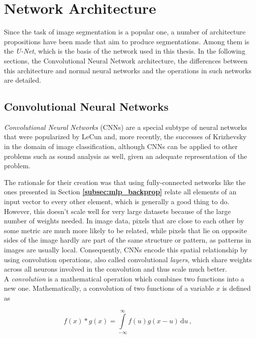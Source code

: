 \chapter {Network Architecture}
\label{chap:network}

Since the task of image segmentation is a popular one, a number of architecture propositions have been made that aim to produce segmentations. Among them is the \textit{U-Net}, which is the basis of the network used in this thesis.  In the following sections, the Convolutional Neural Network architecture, the differences between this architecture and normal neural networks and the operations in such networks are detailed.


	\section{Convolutional Neural Networks}
\label{sec:CNN}
\textit{Convolutional Neural Networks} (CNNs) are a special subtype of neural networks that were popularized by LeCun \cite{lecun98} and, more recently, the successes of Krizhevsky \cite{krizhevsky2012} in the domain of image classification, although CNNs can be applied to other problems such as sound analysis \cite{CNN_sound} as well, given an adequate representation of the problem. 

The rationale for their creation was that using fully-connected networks like the ones presented in Section \textbf{\ref{subsec:mlp_backprop}} relate all elements of an input vector to every other element, which is generally a good thing to do. However, this doesn't scale well for very large datasets because of the large number of weights needed. In image data, pixels that are close to each other by some metric are much more likely to be related, while pixels that lie on opposite sides of the image hardly are part of the same structure or pattern, as patterns in images are usually local. Consequently, CNNs encode this spatial relationship by using convolution operations, also called convolutional \textit{layers}, which share weights across all neurons involved in the convolution and thus scale much better.\\

\noindent A \textit{convolution} is a mathematical operation which combines two functions into a new one. Mathematically, a convolution of two functions of a variable $x$ is defined as

\[ f(x) * g(x) = \int \limits_{-\infty}^{\infty} f(u)g(x - u) \, \text{d}u \,, \]

